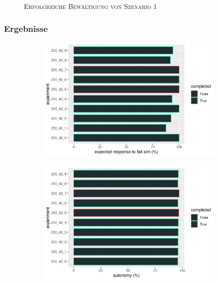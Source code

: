 \documentclass{beamer}
\begin{document}
\begin{frame}
\begin{figure}[H]
\begin{subfigure}[b]{0.24\textwidth}
    \end{subfigure}
  \caption*{\textsc{Erfolgreiche Bewältigung von Szenario $1$}}
  \end{figure}
\end{frame}


\begin{frame}
  \frametitle{Ergebnisse}
  \begin{figure}[H]
    \centering
    \begin{subfigure}[b]{0.49\textwidth}
      \centering
      \includegraphics[width=\textwidth]{img/expected_res.png}
    \end{subfigure}
    \begin{subfigure}[b]{0.49\textwidth}
      \centering
      \includegraphics[width=\textwidth]{img/autonomy_percentage.png}

\end{subfigure}
\end{figure}
\end{frame}
\end{document}
